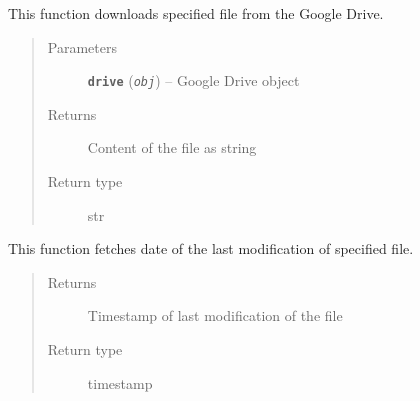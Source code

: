 \documentclass[letterpaper,10pt,english]{sphinxmanual}
\begin{document}
\begin{fulllineitems}
\begin{fulllineitems}
\end{fulllineitems}


\begin{fulllineitems}
\label{rpicameramon:rpicameramon.filemanipulation.ConfFileDownloader.download_file}
This function downloads specified file from the Google Drive.
\begin{quote}\begin{description}
\item[{Parameters}] \leavevmode
\textbf{\texttt{drive}} (\emph{\texttt{obj}}) -- Google Drive object

\item[{Returns}] \leavevmode
Content of the file as string

\item[{Return type}] \leavevmode
str

\end{description}\end{quote}

\end{fulllineitems}


\begin{fulllineitems}
\label{rpicameramon:rpicameramon.filemanipulation.ConfFileDownloader.get_timestamp}
This function fetches date of the last modification of specified file.
\begin{quote}\begin{description}
\item[{Returns}] \leavevmode
Timestamp of last modification of the file

\item[{Return type}] \leavevmode
timestamp

\end{description}\end{quote}

\end{fulllineitems}


\begin{fulllineitems}
\label{rpicameramon:rpicameramon.filemanipulation.ConfFileDownloader.load_config}
\end{fulllineitems}


\end{fulllineitems}
\end{document}
